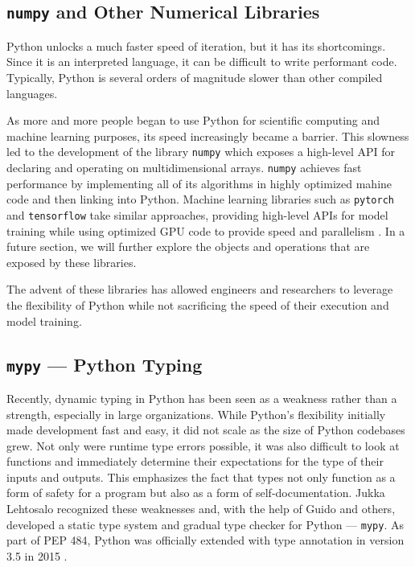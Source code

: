 \documentclass[12pt]{report}
\begin{document}
\subsection{\texttt{numpy} and Other Numerical Libraries}

Python unlocks a much faster speed of iteration, but it has its shortcomings. Since it is an interpreted language, it can be difficult to write performant code. Typically, Python is several orders of magnitude slower than other compiled languages.

As more and more people began to use Python for scientific computing and machine learning purposes, its speed increasingly became a barrier. This slowness led to the development of the library \texttt{numpy} which exposes a high-level API for declaring and operating on multidimensional arrays. \texttt{numpy} achieves fast performance by implementing all of its algorithms in highly optimized mahine code and then linking into Python. Machine learning libraries such as \texttt{pytorch} and \texttt{tensorflow} take similar approaches, providing high-level APIs for model training while using optimized GPU code to provide speed and parallelism \cite{Paszke2017AutomaticDI}. In a future section, we will further explore the objects and operations that are exposed by these libraries.

The advent of these libraries has allowed engineers and researchers to leverage the flexibility of Python while not sacrificing the speed of their execution and model training.

\subsection{\texttt{mypy} --- Python Typing}

Recently, dynamic typing in Python has been seen as a weakness rather than a strength, especially in large organizations. While Python's flexibility initially made development fast and easy, it did not scale as the size of Python codebases grew. Not only were runtime type errors possible, it was also difficult to look at functions and immediately determine their expectations for the type of their inputs and outputs. This emphasizes the fact that types not only function as a form of safety for a program but also as a form of self-documentation. Jukka Lehtosalo recognized these weaknesses and, with the help of Guido and others, developed a static type system and gradual type checker for Python --- \texttt{mypy}. As part of PEP 484, Python was officially extended with type annotation in version 3.5 in 2015 \cite{pep484}.
\end{document}
